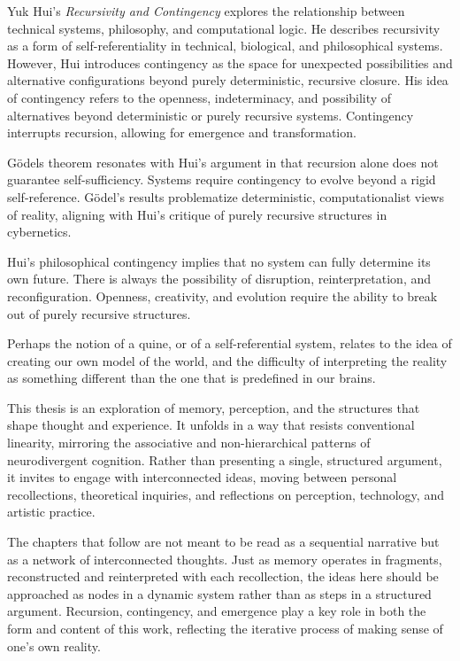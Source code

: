 Yuk Hui's \textit{Recursivity and Contingency} \citep{hui2019} explores the relationship between technical systems, philosophy, and computational logic. He describes recursivity as a form of self-referentiality in technical, biological, and philosophical systems. However, Hui introduces contingency as the space for unexpected possibilities and alternative configurations beyond purely deterministic, recursive closure. His idea of contingency refers to the openness, indeterminacy, and possibility of alternatives beyond deterministic or purely recursive systems. Contingency interrupts recursion, allowing for emergence and transformation.

Gödels theorem resonates with Hui's argument in that recursion alone does not guarantee self-sufficiency. Systems require contingency to evolve beyond a rigid self-reference. Gödel's results problematize deterministic, computationalist views of reality, aligning with Hui's critique of purely recursive structures in cybernetics.

Hui's philosophical contingency implies that no system can fully determine its own future. There is always the possibility of disruption, reinterpretation, and reconfiguration. Openness, creativity, and evolution require the ability to break out of purely recursive structures.

Perhaps the notion of a quine, or of a self-referential system, relates to the idea of creating our own model of the world, and the difficulty of interpreting the reality as something different than the one that is predefined in our brains. 

This thesis is an exploration of memory, perception, and the structures that shape thought and experience. It unfolds in a way that resists conventional linearity, mirroring the associative and non-hierarchical patterns of neurodivergent cognition. Rather than presenting a single, structured argument, it invites to engage with interconnected ideas, moving between personal recollections, theoretical inquiries, and reflections on perception, technology, and artistic practice.

The chapters that follow are not meant to be read as a sequential narrative but as a network of interconnected thoughts. Just as memory operates in fragments, reconstructed and reinterpreted with each recollection, the ideas here should be approached as nodes in a dynamic system rather than as steps in a structured argument. Recursion, contingency, and emergence play a key role in both the form and content of this work, reflecting the iterative process of making sense of one's own reality.

